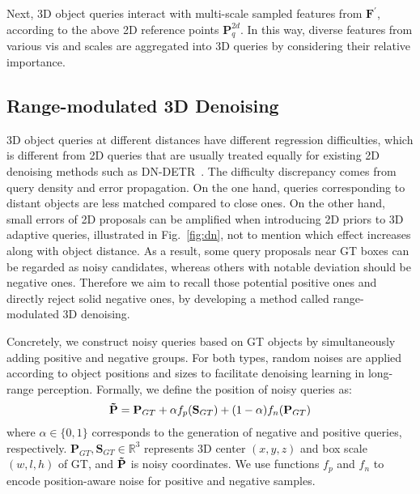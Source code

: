 \documentclass[letterpaper]{article} \usepackage{aaai24}
\begin{document}
Next, 3D object queries interact with multi-scale sampled features from $\mathbf{F^{'}}$, according to the above 2D reference points $\mathbf{P}_q^{2d}$. In this way, diverse features from various vis and scales are aggregated into 3D queries by considering their relative importance.




\subsection{Range-modulated 3D Denoising} \label{sec:denoise}


3D object queries at different distances have different regression difficulties, which is different from 2D queries that are usually treated equally for existing 2D denoising methods such as DN-DETR~\cite{li2022dn}. 
The difficulty discrepancy comes from query density and error propagation. On the one hand, queries corresponding to distant objects are less matched compared to close ones. On the other hand, small errors of 2D proposals can be amplified when introducing 2D priors to 3D adaptive queries, illustrated in Fig.~\ref{fig:dn}, not to mention which effect increases along with object distance. 
As a result, some query proposals near GT boxes can be regarded as noisy candidates, whereas others with notable deviation should be negative ones.
Therefore we aim to recall those potential positive ones and directly reject solid negative ones, by developing a method called range-modulated 3D denoising.


Concretely, we construct noisy queries based on GT objects by simultaneously adding positive and negative groups. For both types, random noises are applied according to object positions and sizes to facilitate denoising learning in long-range perception. Formally, we define the position of noisy queries as:
\begin{equation}
    \mathbf{\Tilde{P}} = \mathbf{P}_{GT} + \alpha f_{p}(\mathbf{S}_{GT}) + (1-\alpha)f_{n}(\mathbf{P}_{GT})
\end{equation}
where $\alpha \in \{0, 1\}$ corresponds to the generation of negative and positive queries, respectively. $\mathbf{P}_{GT}, \mathbf{S}_{GT} \in\mathbb{R}^{3}$ represents 3D center $(x, y, z)$ and box scale $(w, l, h)$ of GT, and $\mathbf{\Tilde{P}}$ is noisy coordinates. We use functions $f_{p}$ and $f_{n}$ to encode position-aware noise for positive and negative samples.
\end{document}
